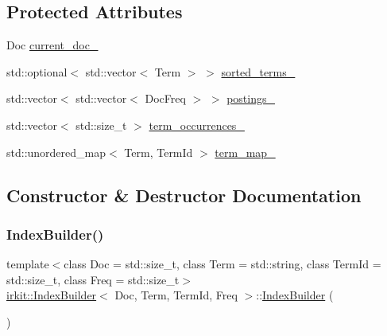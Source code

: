\subsection*{Protected Attributes}
\begin{DoxyCompactItemize}
\item 
Doc \mbox{\hyperlink{classirkit_1_1IndexBuilder_a52d46fb2bd04b9e5ee0e9fdcf98e2f7b}{current\+\_\+doc\+\_\+}}
\item 
std\+::optional$<$ std\+::vector$<$ Term $>$ $>$ \mbox{\hyperlink{classirkit_1_1IndexBuilder_a7a6b13e964f05c659fe17cf61a9738e9}{sorted\+\_\+terms\+\_\+}}
\item 
std\+::vector$<$ std\+::vector$<$ Doc\+Freq $>$ $>$ \mbox{\hyperlink{classirkit_1_1IndexBuilder_a4dcd133d2afe183e6f5bb379592391c4}{postings\+\_\+}}
\item 
std\+::vector$<$ std\+::size\+\_\+t $>$ \mbox{\hyperlink{classirkit_1_1IndexBuilder_aaa27520f3a0fb37dba049d2c26ad9484}{term\+\_\+occurrences\+\_\+}}
\item 
std\+::unordered\+\_\+map$<$ Term, Term\+Id $>$ \mbox{\hyperlink{classirkit_1_1IndexBuilder_aeebb03b89eeab532f62239e4ea4f0bee}{term\+\_\+map\+\_\+}}
\end{DoxyCompactItemize}


\subsection{Constructor \& Destructor Documentation}
\mbox{\label{classirkit_1_1IndexBuilder_ab56476b7728ed2618b8de7511dfe2427}} 
\subsubsection{\texorpdfstring{Index\+Builder()}{IndexBuilder()}}
{\footnotesize\ttfamily template$<$class Doc  = std\+::size\+\_\+t, class Term  = std\+::string, class Term\+Id  = std\+::size\+\_\+t, class Freq  = std\+::size\+\_\+t$>$ \\
\mbox{\hyperlink{classirkit_1_1IndexBuilder}{irkit\+::\+Index\+Builder}}$<$ Doc, Term, Term\+Id, Freq $>$\+::\mbox{\hyperlink{classirkit_1_1IndexBuilder}{Index\+Builder}} (\begin{DoxyParamCaption}{ }\end{DoxyParamCaption})\hspace{0.3cm}{\ttfamily [inline]}}



